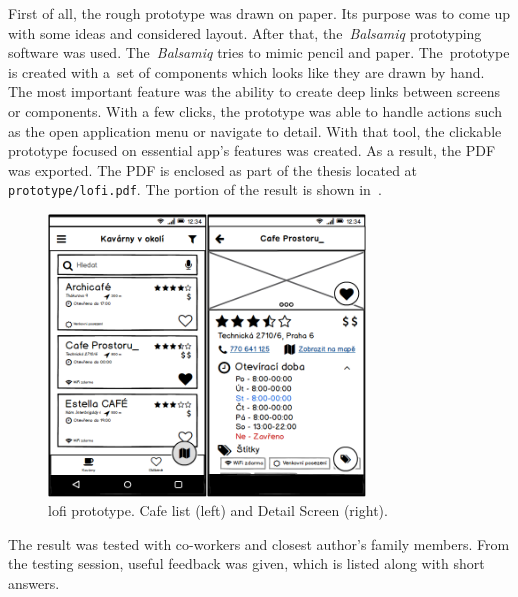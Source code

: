 First of all, the rough prototype was drawn on paper. Its purpose was to come up with some ideas and considered layout. After that, the~\textit{Balsamiq} \cite{balsamiq} prototyping software was used. The~\textit{Balsamiq} tries to mimic pencil and paper. The~prototype is created with a~set of components which looks like they are drawn by hand.
The most important feature was the ability to create deep links between screens or components. With a few clicks, the prototype was able to handle actions such as the open application menu or navigate to detail. With that tool, the clickable prototype focused on essential app's features was created. As a result, the PDF was exported. The PDF is enclosed as part of the thesis located at \verb|prototype/lofi.pdf|. The portion of the result is shown in~.

\begin{figure}[htp]
    \centering
    \includegraphics[width=0.75\textwidth]{img/analysis/lofi.png}
    \caption{\gls{lofi} prototype. Cafe list (left) and Detail Screen (right).}
    \label{fig:lofi}
\end{figure}

The result was tested with co-workers and closest author's family members. From the testing session, useful feedback was given, which is listed along with short answers. 

